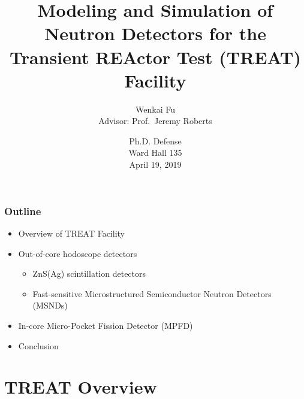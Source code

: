 \documentclass[fleqn]{beamer}
\title[Modeling of TREAT Detectors]{
    Modeling and Simulation of Neutron Detectors for the Transient REActor Test (TREAT) Facility}
\author[Wenkai Fu]{
    Wenkai Fu\\
    Advisor: Prof.~Jeremy Roberts}
\institute[Kansas State University]{
    Department of Mechanical and Nuclear Engineering \\
    Kansas State University}
\date[Ph.D. Defense]{
    Ph.D. Defense\\
    Ward Hall 135\\
    April 19, 2019}
\begin{document}
    \newcommand{\beginbackup}{
        \newcounter{framenumbervorappendix}
        \setcounter{framenumbervorappendix}{\value{framenumber}}
    }
    \newcommand{\backupend}{
        \addtocounter{framenumbervorappendix}{-\value{framenumber}}
        \addtocounter{framenumber}{\value{framenumbervorappendix}}
    }
    
    \begin{frame}
        \titlepage
    \end{frame}

    \begin{frame}
     \frametitle{Outline}
      \begin{itemize}
       \item Overview of TREAT Facility
       \item Out-of-core hodoscope detectors
       
       \begin{itemize}
        \item ZnS(Ag) scintillation detectors
        \item Fast-sensitive Microstructured Semiconductor Neutron Detectors (MSNDs)
       \end{itemize}
       \item In-core Micro-Pocket Fission Detector (MPFD)
       \item Conclusion
      \end{itemize}
    \end{frame}

    \section{TREAT Overview}
    
\end{document}
